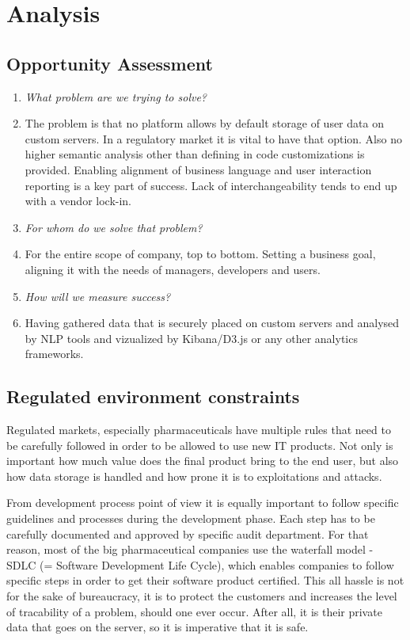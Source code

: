 \chapter{Analysis}


\section{Opportunity Assessment}

\begin{enumerate}
	\item \emph{What problem are we trying to solve?}
	\item[] The problem is that no platform allows by default storage of user data on custom servers. In a regulatory market it is vital to have that option. Also no higher semantic analysis other than defining in code customizations is provided. Enabling alignment of business language and user interaction reporting is a key part of success. Lack of interchangeability tends to end up with a vendor lock-in.
	
	\item \emph{For whom do we solve that problem?}
	\item[] 	For the entire scope of company, top to bottom. Setting a business goal, aligning it with the needs of managers, developers and users.
	
	\item \emph{How will we measure success?}
	\item[] Having gathered data that is securely placed on custom servers and analysed by NLP tools and vizualized by Kibana/D3.js or any other analytics frameworks.
\end{enumerate}


\section{Regulated environment constraints}

Regulated markets, especially pharmaceuticals have multiple rules that need to be carefully followed in order to be allowed to use new IT products. Not only is important how much value does the final product bring to the end user, but also how data storage is handled and how prone it is to exploitations and attacks. 

From development process point of view it is equally important to follow specific guidelines and processes during the development phase. Each step has to be carefully documented and approved by specific audit department. For that reason, most of the big pharmaceutical companies use the waterfall model - SDLC (= Software Development Life Cycle), which enables companies to follow specific steps in order to get their software product certified. This all hassle is not for the sake of bureaucracy, it is to protect the customers and increases the level of tracability of a problem, should one ever occur. After all, it is their private data that goes on the server, so it is imperative that it is safe.

